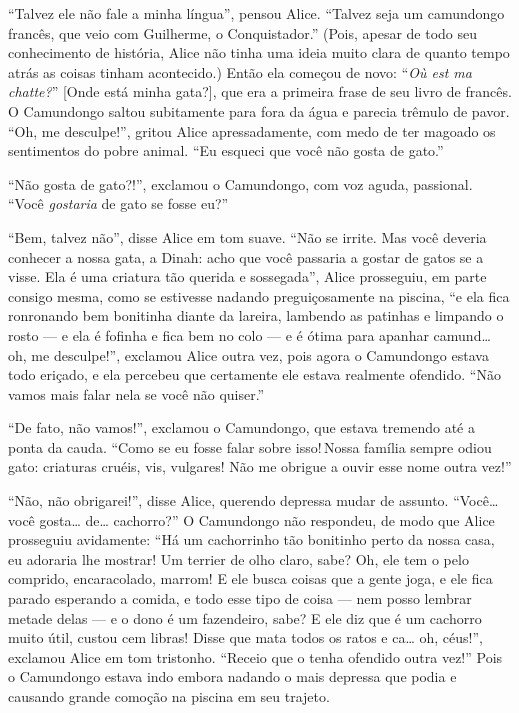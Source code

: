 ``Talvez ele não fale a minha língua'', pensou Alice. ``Talvez seja um
camundongo francês, que veio com Guilherme, o Conquistador.'' (Pois,
apesar de todo seu conhecimento de história, Alice não tinha uma ideia
muito clara de quanto tempo atrás as coisas tinham acontecido.) Então
ela começou de novo: ``\emph{Où est ma chatte?}'' {[}Onde está minha
gata?{]}, que era a primeira frase de seu livro de francês. O Camundongo
saltou subitamente para fora da água e parecia trêmulo de pavor. ``Oh,
me desculpe!'', gritou Alice apressadamente, com medo de ter magoado os
sentimentos do pobre animal. ``Eu esqueci que você não gosta de gato.''

``Não gosta de gato?!'', exclamou o Camundongo, com voz aguda,
passional. ``Você \emph{gostaria} de gato se fosse eu?''

``Bem, talvez não'', disse Alice em tom suave. ``Não se irrite. Mas você
deveria conhecer a nossa gata, a Dinah: acho que você passaria a gostar
de gatos se a visse. Ela é uma criatura tão querida e sossegada'', Alice
prosseguiu, em parte consigo mesma, como se estivesse nadando
preguiçosamente na piscina, ``e ela fica ronronando bem bonitinha diante
da lareira, lambendo as patinhas e limpando o rosto --- e ela é fofinha e
fica bem no colo --- e é ótima para apanhar camund\ldots{} oh, me desculpe!'',
exclamou Alice outra vez, pois agora o Camundongo estava todo eriçado, e
ela percebeu que certamente ele estava realmente ofendido. ``Não vamos
mais falar nela se você não quiser.''

``De fato, não vamos!'', exclamou o Camundongo, que estava tremendo até
a ponta da cauda. ``Como se eu fosse falar sobre isso!\,Nossa família
sempre odiou gato: criaturas cruéis, vis, vulgares! Não me obrigue a
ouvir esse nome outra vez!''

``Não, não obrigarei!'', disse Alice, querendo depressa mudar de
assunto. ``Você\ldots{} você gosta\ldots{} de\ldots{} cachorro?'' O Camundongo não
respondeu, de modo que Alice prosseguiu avidamente: ``Há um cachorrinho
tão bonitinho perto da nossa casa, eu adoraria lhe mostrar! Um terrier
de olho claro, sabe? Oh, ele tem o pelo comprido, encaracolado, marrom!
E ele busca coisas que a gente joga, e ele fica parado esperando a
comida, e todo esse tipo de coisa --- nem posso lembrar metade delas --- e
o dono é um fazendeiro, sabe? E ele diz que é um cachorro muito útil,
custou cem libras! Disse que mata todos os ratos e ca\ldots{} oh, céus!'',
exclamou Alice em tom tristonho. ``Receio que o tenha ofendido outra
vez!'' Pois o Camundongo estava indo embora nadando o mais depressa que
podia e causando grande comoção na piscina em seu trajeto.

